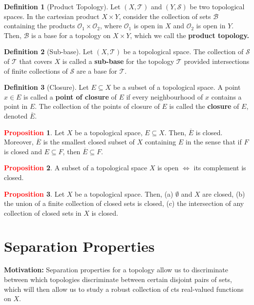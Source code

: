 \documentclass[11pt]{article}
\newcommand{\open}[0]{\mathcal{O}}
\newcommand{\topo}[0]{\mathcal{T}}
\theoremstyle{definition}
\theoremstyle{definition}
\theoremstyle{definition}
\newtheorem{definition}{\textcolor{OliveGreen}{Definition}}
\newtheorem{prop}{\textcolor{red}{Proposition}}
\theoremstyle{remark}
\begin{document}
\begin{definition}[Product Topology]
	Let $(X, \topo)$ and $(Y, \mathcal{S})$ be two topological spaces. In the cartesian product $X \times Y$, consider the collection of sets $\mathcal{B}$ containing the products $\open_1 \times \open_2$, where $\open_1$ is open in $X$ and $\open_2$ is open in $Y$. Then, $\mathcal{B}$ is a base for a topology on $X \times Y$, which we call the \textbf{product topology.}
\end{definition}

\begin{definition}[Sub-base]
	Let $(X, \topo)$ be a topological space. The collection of $\mathcal{S}$ of $\topo$ that covers $X$ is called a \textbf{sub-base} for the topology $\topo$ provided intersections of finite collections of $\mathcal{S}$ are a base for $\topo$. 
\end{definition}

\begin{definition}[Closure]
	Let $E \subseteq X$ be a subset of a topological space. A point $x \in E$ is called a \textbf{point of closure} of $E$ if every neighbourhood of $x$ contains a point in $E$. The collection of the points of closure of $E$ is called the \textbf{closure} of $E$, denoted $\overline{E}$. 
\end{definition}

\begin{prop}
	Let $X$ be a topological space, $E \subseteq X$. Then, $\overline{E}$ is closed. Moreover, $\overline{E}$ is the smallest closed subset of $X$ containing $E$ in the sense that if $F$ is closed and $E \subseteq F$, then $\overline{E} \subseteq F$. 
\end{prop}

\begin{prop}
	A subset of a topological space $X$ is open $\iff$ its complement is closed. 
\end{prop}

\begin{prop}
	Let $X$ be a topological space. Then, (a) $\emptyset$ and $X$ are closed, (b) the union of a finite collection of closed sets is closed, (c) the intersection of any collection of closed sets in $X$ is closed. 
\end{prop}

\section{Separation Properties}
\textbf{Motivation:} Separation properties for a topology allow us to discriminate between which topologies discriminate between certain disjoint pairs of sets, which will then allow us to study a robust collection of cts real-valued functions on $X$. 
\end{document}
